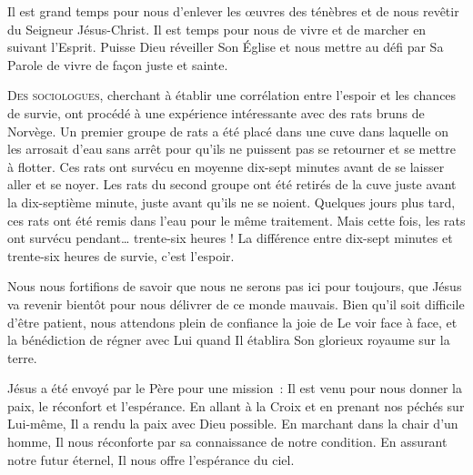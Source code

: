 Il est grand temps pour nous d'enlever les \oe{}uvres des ténèbres
 et de nous revêtir du Seigneur Jésus-Christ.
 Il est temps pour nous de vivre et de marcher en suivant l'Esprit.
 Puisse Dieu réveiller Son Église 
 et nous mettre au défi par Sa Parole de vivre de façon juste et sainte.

\dvrule






\lettrine{D}{es sociologues,} cherchant à établir une corrélation
 entre l'espoir et les chances de survie,
 ont procédé à une expérience intéressante
 avec des rats bruns de Norvège.
 Un premier groupe de rats a été placé dans une cuve
 dans laquelle on les arrosait d'eau sans arrêt
 pour qu'ils ne puissent pas se retourner et se mettre à flotter.
 Ces rats ont survécu en moyenne dix-sept minutes
 avant de se laisser aller et se noyer.
 Les rats du second groupe ont été retirés de la cuve
 juste avant la dix-septième minute, juste avant qu'ils ne se noient.
 Quelques jours plus tard, ces rats ont été remis dans l'eau
 pour le même traitement.
 Mais cette fois, les rats ont survécu pendant\dots{} trente-six heures !
 La différence entre dix-sept minutes et trente-six heures de survie,
 c'est l'espoir.


Nous nous fortifions de savoir que nous ne serons pas ici pour toujours,
 que Jésus va revenir bientôt pour nous délivrer de ce monde mauvais.
 Bien qu'il soit difficile d'être patient, nous attendons plein de confiance
 la joie de Le voir face à face, et la bénédiction de régner avec Lui
 quand Il établira Son glorieux royaume sur la terre.

Jésus a été envoyé par le Père pour une mission~:
 Il est venu pour nous donner la paix, le réconfort et l'espérance.
 En allant à la Croix et en prenant nos péchés sur Lui-même,
 Il a rendu la paix avec Dieu possible.
 En marchant dans la chair d'un homme,
 Il nous réconforte par sa connaissance de notre condition.
 En assurant notre futur éternel, Il nous offre l'espérance du ciel.

